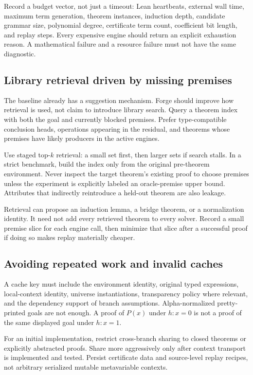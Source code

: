 \documentclass[11pt,a4paper]{article}
\begin{document}
Record a budget vector, not just a timeout: Lean heartbeats, external wall time,
maximum term generation, theorem instances, induction depth, candidate grammar
size, polynomial degree, certificate term count, coefficient bit length, and
replay steps. Every expensive engine should return an explicit exhaustion reason.
A mathematical failure and a resource failure must not have the same diagnostic.

\subsection{Library retrieval driven by missing premises}
The baseline already has a suggestion mechanism. Forge should improve how
retrieval is used, not claim to introduce library search. Query a theorem index
with both the goal and currently blocked premises. Prefer type-compatible
conclusion heads, operations appearing in the residual, and theorems whose
premises have likely producers in the active engines.

Use staged top-$k$ retrieval: a small set first, then larger sets if search
stalls. In a strict benchmark, build the index only from the original
pre-theorem environment. Never inspect the target theorem's existing proof to
choose premises unless the experiment is explicitly labeled an oracle-premise
upper bound. Attributes that indirectly reintroduce a held-out theorem are
also leakage.

Retrieval can propose an induction lemma, a bridge theorem, or a normalization
identity. It need not add every retrieved theorem to every solver. Record a
small premise slice for each engine call, then minimize that slice after a
successful proof if doing so makes replay materially cheaper.

\subsection{Avoiding repeated work and invalid caches}
A cache key must include the environment identity, original typed expressions,
local-context identity, universe instantiations, transparency policy where
relevant, and the dependency support of branch assumptions. Alpha-normalized
pretty-printed goals are not enough. A proof of $P(x)$ under $h:x=0$ is not a
proof of the same displayed goal under $h:x=1$.

For an initial implementation, restrict cross-branch sharing to closed theorems
or explicitly abstracted proofs. Share more aggressively only after context
transport is implemented and tested. Persist certificate data and source-level
replay recipes, not arbitrary serialized mutable metavariable contexts.
\end{document}

